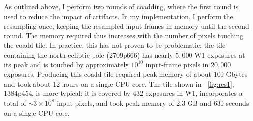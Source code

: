 \documentclass[11pt,preprint]{aastex}
\newcommand{\figref}[1]{\figurename~\ref{#1}}
\newcommand{\thou}{,\!000}
\begin{document}
As outlined above, I perform two rounds of coadding, where the first
round is used to reduce the impact of artifacts.  In my
implementation, I perform the resampling once, keeping the
resampled input frames in memory until the second round.  The memory
required thus increases with the number of pixels touching the coadd
tile.  In practice, this has not proven to be problematic: the tile
containing the north ecliptic pole (2709p666) has nearly $5\thou$ W1
exposures at its peak and is touched by approximately $10^{10}$
input-frame pixels in $20\thou$ exposures.  Producing this coadd tile
required peak memory of about $100$ Gbytes and took about $12$ hours
on a single CPU core.  The tile shown in \figref{fig:res1}, 1384p454,
is more typical: it is covered by $432$ exposures in W1, incorporates
a total of $\sim 3 \times 10^{8}$ input pixels, and took peak memory
of $2.3$ GB and $630$ seconds on a single CPU core.
\end{document}
